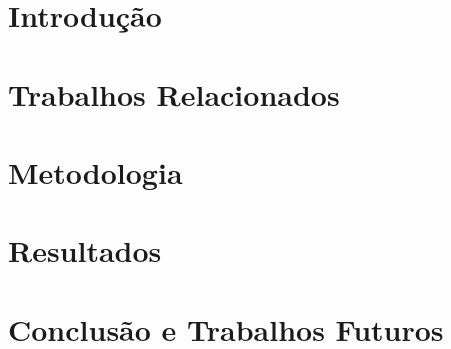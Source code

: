 \documentclass[12pt]{article}
\begin{document}
\section{Introdução}


\section{Trabalhos Relacionados} \label{sec:related_works}


\section{Metodologia} \label{sec:methods}


\section{Resultados} \label{sec:results}


\section{Conclusão e Trabalhos Futuros} \label{sec:conclusion}





% 
\end{document}
